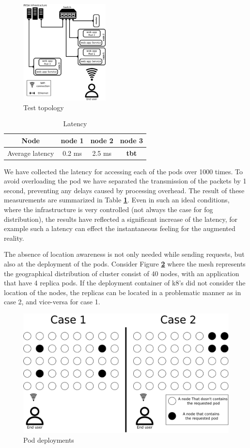 \documentclass[letterpaper,twocolumn,10pt]{article}
\let\origref\ref
\def\ref#1{\textbf{\origref{#1}}}
\begin{document}
 
\begin{figure}[th]
\centering\includegraphics[width=0.4\textwidth]{images/clus.png}
\caption{Test topology}
\label{fig:clus}
\end{figure}
\begin{table}[h]
\begin{center}
\begin{tabular}{ c || c c c }
 Node & node 1 & node 2 & node 3\\
 \hline 
 Average latency & 0.2 ms & 2.5 ms & {\bf tbt}
\end{tabular}
\caption{Latency}\label{tab:lat}
\end{center}
\end{table}

We have collected the latency for accessing each of the pods over 1000 times. To avoid overloading the pod we have separated the transmission of the packets by 1 second, preventing any delays caused by processing overhead. The result of these measurements are summarized in Table \ref{tab:lat}. Even in such an ideal conditions, where the infrastructure is very controlled (not always the case for fog distribution), the results have reflected a significant increase of the latency, for example such a latency can effect the instantaneous feeling for the augmented reality.

The absence of location awareness is not only needed while sending requests, but also at the deployment of the pods. Consider Figure \ref{fig:dep} where the mesh represents the geographical distribution of cluster consist of 40 nodes, with an application that have 4 replica pods. If the deployment container of k8's did not consider the location of the nodes, the replicas can be located in a problematic manner as in case 2, and vice-versa for case 1. 

\begin{figure}[th]
\centering\includegraphics[width=.5\textwidth]{images/dep.png}
\caption{Pod deployments}
\label{fig:dep}
\end{figure}
\end{document}
